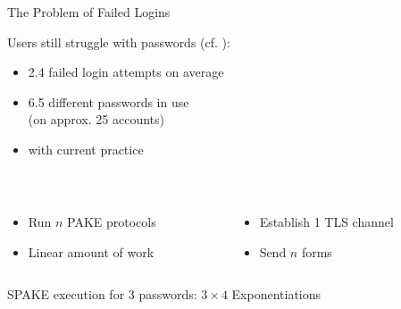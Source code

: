 \documentclass[notes,xcolor=dvipsnames]{beamer}
\begin{document}
\begin{frame}{The Problem of Failed Logins}{}

	Users still struggle with passwords (cf. \cite{Florencio2007,Gaw2006a}):
	
	\begin{itemize}
		\item 2.4 failed login attempts on average
		\item 6.5 different passwords in use\\ (on approx. 25 accounts)
		\item {} with current practice
	\end{itemize}
	\pause\vspace*{1em}

	\begin{columns}[t]
    \begin{column}{.475\linewidth}
	    	{\centering{}}\\
	    	\begin{itemize}
	    		\setlength{\itemindent}{-1em}
	    		\item Run $n$ PAKE protocols
		    \item Linear amount of work
	    	\end{itemize}
    \end{column}
    \begin{column}{.475\linewidth}
    		{\centering{}}\\
    		\begin{itemize}
	    		\setlength{\itemindent}{-1em}
	    		\item Establish 1 TLS channel
	    		\item Send $n$ forms
    		\end{itemize}
    \end{column}
  \end{columns}
	\vspace*{2em}
	SPAKE execution for $3$ passwords: $3\times4$ Exponentiations%
\end{frame}
\end{document}
